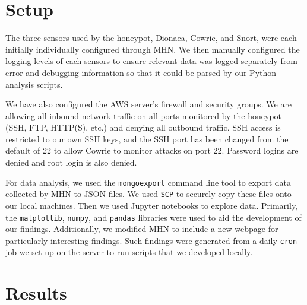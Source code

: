 \documentclass[a0,landscape]{a0poster}
\begin{document}
\begin{multicols}{3}

\section*{Setup}
The three sensors used by the honeypot, Dionaea, Cowrie, and Snort, were each initially individually configured through MHN. We then manually configured the logging levels of each sensors to ensure relevant data was logged separately from error and debugging information so that it could be parsed by our Python analysis scripts. 

We have also configured the AWS server's firewall and security groups. We are allowing all inbound network traffic on all ports monitored by the honeypot (SSH, FTP, HTTP(S), etc.) and denying all outbound traffic. SSH access is restricted to our own SSH keys, and the SSH port has been changed from the default of 22 to allow Cowrie to monitor attacks on port 22. Password logins are denied and root login is also denied. 

For data analysis, we used the \texttt{mongoexport} command line tool to export data collected by MHN to JSON files. We used \texttt{SCP} to securely copy these files onto our local machines. Then we used Jupyter notebooks to explore data. Primarily, the \texttt{matplotlib}, \texttt{numpy}, and \texttt{pandas} libraries were used to aid the development of our findings. Additionally, we modified MHN to include a new webpage for particularly interesting findings. Such findings were generated from a daily \texttt{cron} job we set up on the server to run scripts that we developed locally.

\section*{Results}


\end{multicols}
\end{document}
